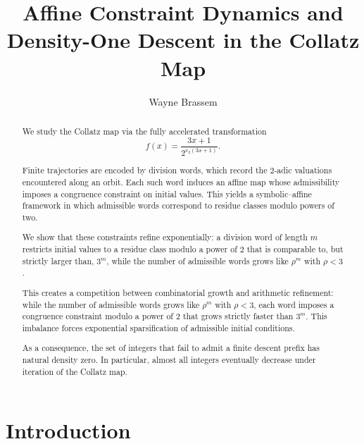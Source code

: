 \documentclass[12pt, oneside]{article}
\title{Affine Constraint Dynamics and Density-One Descent in the Collatz Map}
\author{Wayne Brassem}
\numberwithin{equation}{section}
\theoremstyle{definition}
\theoremstyle{plain}
\theoremstyle{remark}
\begin{document}


\maketitle

\begin{abstract}

We study the Collatz map via the fully accelerated transformation
\[
f(x)=\frac{3x+1}{2^{v_2(3x+1)}}.
\]

Finite trajectories are encoded by division words, which record the
2-adic valuations encountered along an orbit. Each such word induces
an affine map whose admissibility imposes a congruence constraint on
initial values. This yields a symbolic–affine framework in which
admissible words correspond to residue classes modulo powers of two.

We show that these constraints refine exponentially: a division word
of length $m$ restricts initial values to a residue class modulo a
power of $2$ that is comparable to, but strictly larger than, $3^m$,
while the number of admissible words grows like $\rho^m$ with $\rho < 3$.

This creates a competition between combinatorial growth and arithmetic
refinement: while the number of admissible words grows like $\rho^m$
with $\rho < 3$, each word imposes a congruence constraint modulo a
power of $2$ that grows strictly faster than $3^m$. This imbalance
forces exponential sparsification of admissible initial conditions.

As a consequence, the set of integers that fail to admit a finite
descent prefix has natural density zero. In particular, almost all
integers eventually decrease under iteration of the Collatz map.

\end{abstract}

\newpage
\tableofcontents

\newpage
\section{Introduction}
\end{document}
